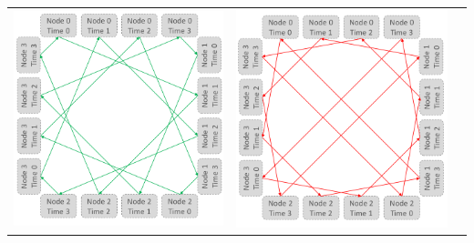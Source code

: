 \documentclass[11pt]{article}
\begin{document}
\begin{table}[H]
{\begin{tabular}{ccc}
			\includegraphics[scale=0.2]{figures/salesman-penalties4.png} &
			\includegraphics[scale=0.2]{figures/salesman-penalties5.png} &

\end{tabular}}
\end{table}
\end{document}
